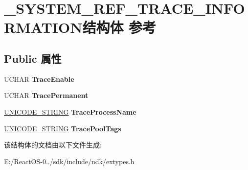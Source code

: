 \hypertarget{struct___s_y_s_t_e_m___r_e_f___t_r_a_c_e___i_n_f_o_r_m_a_t_i_o_n}{}\section{\+\_\+\+S\+Y\+S\+T\+E\+M\+\_\+\+R\+E\+F\+\_\+\+T\+R\+A\+C\+E\+\_\+\+I\+N\+F\+O\+R\+M\+A\+T\+I\+O\+N结构体 参考}
\label{struct___s_y_s_t_e_m___r_e_f___t_r_a_c_e___i_n_f_o_r_m_a_t_i_o_n}
\subsection*{Public 属性}
\begin{DoxyCompactItemize}
\item 
\mbox{\label{struct___s_y_s_t_e_m___r_e_f___t_r_a_c_e___i_n_f_o_r_m_a_t_i_o_n_a5da931ee2a95122e9b6e8dac02f85d65}} 
U\+C\+H\+AR {\bfseries Trace\+Enable}
\item 
\mbox{\label{struct___s_y_s_t_e_m___r_e_f___t_r_a_c_e___i_n_f_o_r_m_a_t_i_o_n_a1c44a24827165c800e24d585f0d981f9}} 
U\+C\+H\+AR {\bfseries Trace\+Permanent}
\item 
\mbox{\label{struct___s_y_s_t_e_m___r_e_f___t_r_a_c_e___i_n_f_o_r_m_a_t_i_o_n_a0f5547361f1c0bc3c6f521ae6b7967fc}} 
\hyperlink{struct___u_n_i_c_o_d_e___s_t_r_i_n_g}{U\+N\+I\+C\+O\+D\+E\+\_\+\+S\+T\+R\+I\+NG} {\bfseries Trace\+Process\+Name}
\item 
\mbox{\label{struct___s_y_s_t_e_m___r_e_f___t_r_a_c_e___i_n_f_o_r_m_a_t_i_o_n_a5171409fe19f878182365f76c6910916}} 
\hyperlink{struct___u_n_i_c_o_d_e___s_t_r_i_n_g}{U\+N\+I\+C\+O\+D\+E\+\_\+\+S\+T\+R\+I\+NG} {\bfseries Trace\+Pool\+Tags}
\end{DoxyCompactItemize}


该结构体的文档由以下文件生成\+:\begin{DoxyCompactItemize}
\item 
E\+:/\+React\+O\+S-\/0../sdk/include/ndk/extypes.\+h\end{DoxyCompactItemize}
